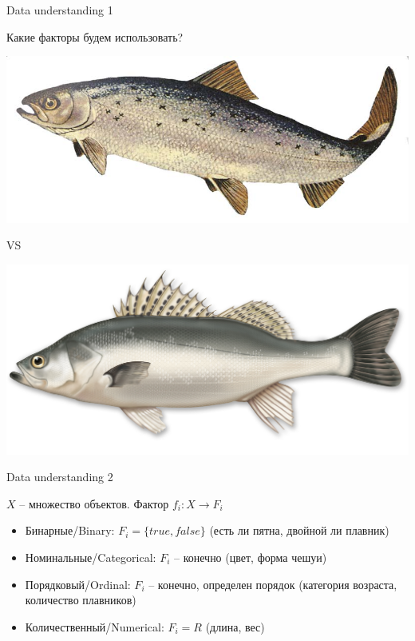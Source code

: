 \documentclass[10pt,a4paper]{beamer}
\begin{document}
\begin{frame}{Data understanding 1}

Какие факторы будем использовать?

\begin{center}
\includegraphics[scale=0.2]{images/salmon.jpg}

VS

\includegraphics[scale=0.2]{images/seabass.jpg}
\end{center}

\end{frame}


\begin{frame}{Data understanding 2}

$X$ -- множество объектов. Фактор $f_i: X \rightarrow F_i$

\begin{itemize}
\item Бинарные/Binary: $F_i = \{true, false\}$ (есть ли пятна, двойной ли плавник)
\item Номинальные/Categorical: $F_i$ -- конечно (цвет, форма чешуи)
\item Порядковый/Ordinal: $F_i$ -- конечно, определен порядок (категория возраста, количество плавников)
\item Количественный/Numerical: $F_i = R$ (длина, вес)

\end{itemize}

\end{frame}
\end{document}
